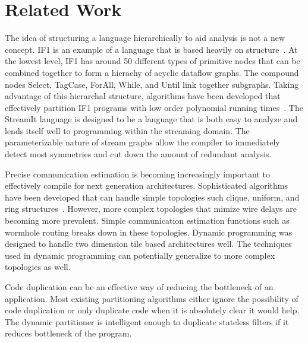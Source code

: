 \section{Related Work}







The idea of structuring a language hierarchically to aid analysis is not
a new concept. IF1 is an example of a language that is based heavily on
structure~\cite{Sked}. At the lowest level, IF1 has around 50 different
types of primitive nodes that can be combined together to form a hierachy
of acyclic dataflow graphs. The compound nodes Select, TagCase, ForAll,
While, and Until link together subgraphs. Taking advantage of this
hierarchal structure, algorithms have
been developed that effectively partition IF1 programs with low order
polynomial running times~\cite{Sarker}. The StreamIt language is designed
to be a language that is both easy to analyze and lends itself well to
programming within the streaming domain. The parameterizable nature of
stream graphs allow the compiler to immediately detect most symmetries
and cut down the amount of redundant analysis.

Precise communication estimation is becoming increasingly important to
effectively compile for next generation architectures. Sophisticated
algorithms have been developed that can handle simple topologies such
clique, uniform, and ring structures~\cite{Tao}. However, more complex
topologies that mimize wire delays are becoming more prevalent.
Simple communication estimation functions such as wormhole routing
breaks down in these topologies. Dynamic programming was designed to
handle two dimension tile based architectures well. The techniques
used in dynamic programming can potentially generalize to more complex
topologies as well.

Code duplication can be an effective way of reducing the bottleneck
of an application. Most existing partitioning algorithms either ignore
the possibility of code duplication or only duplicate code when it is
absolutely clear it would help. The dynamic partitioner is intelligent
enough to duplicate stateless filters if it reduces bottleneck
of the program.